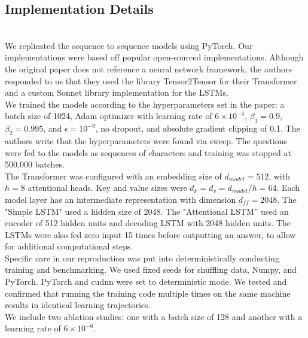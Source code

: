 \subsection{Implementation Details} \\

We replicated the sequence to sequence models using PyTorch\supercite{paszke2019pytorch}. Our implementations were based off popular open-sourced implementations\supercite{nlp-tutorial}\supercite{pytorch_math_dataset}\supercite{attention-is-all-you-need}. Although the original paper does not reference a neural network framework, the authors responded to us that they used the library Tensor2Tensor\supercite{vaswani2018tensor2tensor} for their Transformer and a custom Sonnet\supercite{sonnet} library implementation for the LSTMs.\\

We trained the models according to the hyperparameters set in the paper: a batch size of 1024, Adam optimizer with learning rate of $6 \times 10^{-4}$,  $\beta_{1} = 0.9$, $\beta_{2} = 0.995$, and $\epsilon = 10^{-9}$, no dropout, and absolute gradient clipping of 0.1. The authors write that the hyperparameters were found via sweep. The questions were fed to the models as sequences of characters and training was stopped at 500,000 batches.\\

The Transformer was configured with an embedding size of $d_{model} = 512$, with $h = 8$ attentional heads. Key and value sizes were $d_{k} = d_{v} = d_{model}/h = 64$. Each model layer has an intermediate representation with dimension $d_{ff} = 2048$. The "Simple LSTM" used a hidden size of 2048. The "Attentional LSTM” used an encoder of 512 hidden units and decoding LSTM with 2048 hidden units. The LSTMs were also fed zero input 15 times before outputting an answer, to allow for additional computational steps. \\

Specific care in our reproduction was put into deterministically conducting training and benchmarking. We used fixed seeds for shuffling data, Numpy, and PyTorch. PyTorch and cudnn were set to deterministic mode. We tested and confirmed that running the training code multiple times on the same machine results in identical learning trajectories. \\

We include two ablation studies: one with a batch size of 128 and another with a learning rate of $6 \times 10^{-6}$. \\

